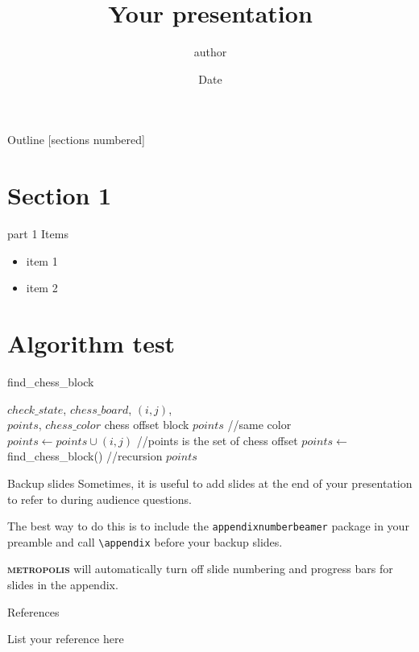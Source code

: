 \documentclass[10pt]{beamer}
\title{Your presentation}
\date{Date} %
\author{author}
\institute{Institute, department}
\newcommand{\themename}{\textbf{\textsc{metropolis}}\xspace}
\begin{document}
\maketitle

\begin{frame}{Outline}
  [sections numbered]
  \tableofcontents[hideallsubsections]
\end{frame}

\section{Section 1}
\begin{frame}[fragile]{part 1}
	Items
	\begin{itemize}
		\item item 1
		\item item 2
	\end{itemize}
\end{frame}


\section{Algorithm test}
\begin{frame}[fragile]
\begin{algorithm}[H]
\caption{find\_chess\_block}	
\begin{algorithmic}[1]
	\REQUIRE $check\_state$, $chess\_board$, $(i,j)$,\\$points$, $chess\_color$
 	\ENSURE  chess offset block $points$ //same color
 	\STATE $points \gets points \cup (i,j)$ //points is the set of chess offset
  			\STATE $points \gets$ {find\_chess\_block(\;)} //recursion
  		\ENDIF
  	\ENDFOR
 \RETURN $points$ 
 \end{algorithmic} 
 \end{algorithm}
\end{frame}



\appendix

\begin{frame}[fragile]{Backup slides}
  Sometimes, it is useful to add slides at the end of your presentation to
  refer to during audience questions.

  The best way to do this is to include the \verb|appendixnumberbeamer|
  package in your preamble and call \verb|\appendix| before your backup slides.

  \themename will automatically turn off slide numbering and progress bars for
  slides in the appendix.
\end{frame}

\begin{frame}[allowframebreaks]{References}

  
  
	List your reference here
\end{frame}
\end{document}
